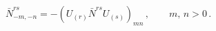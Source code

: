 \begin{equation}\label{neg}
\bar{N}^{rs}_{-m,-n}=-\left(U_{(r)}\bar{N}^{rs}U_{(s)}\right)_{mn}\,,
\qquad m,\,n>0\,.
\end{equation}


